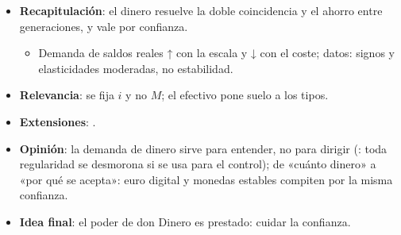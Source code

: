 \documentclass{article}
\begin{document}
\begin{columnas}
\begin{itemize}
\item \textbf{Recapitulación}: el dinero resuelve la doble coincidencia y el ahorro entre generaciones, y vale por confianza.
  \begin{itemize}
  \item Demanda de saldos reales ↑ con la escala y ↓ con el coste; datos: signos y elasticidades moderadas, no estabilidad.
  \end{itemize}
\item \textbf{Relevancia}: se fija $i$ y no $M$; el efectivo pone suelo a los tipos.
\item \textbf{Extensiones}:     .
\item \textbf{Opinión}: la demanda de dinero sirve para entender, no para dirigir (: toda regularidad se desmorona si se usa para el control); de «cuánto dinero» a «por qué se acepta»: euro digital y monedas estables compiten por la misma confianza.
\item \textbf{Idea final}: el poder de don Dinero es prestado: cuidar la confianza.
\end{itemize}


\end{columnas}
\end{document}
